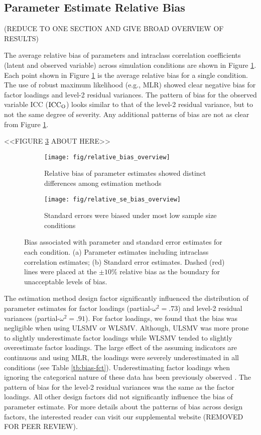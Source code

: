 \documentclass[Review,sageh,times, doublespace]{sagej}
\begin{document}
\subsection{Parameter Estimate Relative Bias}

(REDUCE TO ONE SECTION AND GIVE BROAD OVERVIEW OF RESULTS)

The average relative bias of parameters and intraclass correlation coefficients (latent and observed variable) across simulation conditions are shown in Figure \ref{fig:rb-para}.
Each point shown in Figure \ref{fig:rb-para} is the average relative bias for a single condition.
The use of robust maximum likelihood (e.g., MLR) showed clear negative bias for factor loadings and level-2 residual variances.
The pattern of bias for the observed variable ICC (${\rm ICC_{O}}$) looks similar to that of the level-2 residual variance, but to not the same degree of severity.
Any additional patterns of bias are not as clear from Figure \ref{fig:rb-para}.

<<FIGURE \ref{fig:rb} ABOUT HERE>>
\begin{figure}[!htp]
\centering
\begin{subfigure}[b]{1\textwidth}
\centering
\texttt{[image: fig/relative\_bias\_overview]}
\caption{Relative bias of parameter estimates showed distinct differences among estimation methods}
\label{fig:rb-para}
\end{subfigure}

\begin{subfigure}[b]{1\textwidth}
\centering
\texttt{[image: fig/relative\_se\_bias\_overview]}
\caption{Standard errors were biased under most low sample size conditions}
\label{fig:rb-se}
\end{subfigure}
\caption{Bias associated with parameter and standard error estimates for each condition. {(a) Parameter estimates including intraclass correlation estimates; (b) Standard error estimates. Dashed (red) lines were placed at the $\pm10$\% relative bias as the boundary for unacceptable levels of bias.}}
\label{fig:rb}
\end{figure}

The estimation method design factor significantly influenced the distribution of parameter estimates for factor loadings (partial-$\omega^2 = .73$) and level-2 residual variances (partial-$\omega^2 = .91$).
For factor loadings, we found that the bias was negligible when using ULSMV or WLSMV.
Although, ULSMV was more prone to slightly underestimate factor loadings while WLSMV tended to slightly overestimate factor loadings.
The large effect of the assuming indicators are continuous and using MLR, the loadings were severely underestimated in all conditions (see Table \ref{tb:bias-fct}).
Underestimating factor loadings when ignoring the categorical nature of these data has been previously observed \citep{DiStefano2002, Li2016}.
The pattern of bias for the level-2 residual variances was the same as the factor loadings.
All other design factors did not significantly influence the bias of parameter estimate.
For more details about the patterns of bias across design factors, the interested reader can visit our supplemental website (REMOVED FOR PEER REVIEW). %
\end{document}
